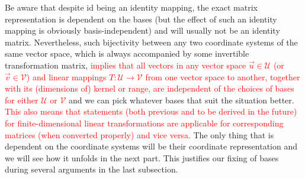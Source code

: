 Be aware that despite $\text{id}$ being an identity mapping, the exact matrix representation is dependent on the bases (but the effect of such an identity mapping is obviously basis-independent) and will usually not be an identity matrix. Nevertheless, such bijectivity between any two coordinate systems of the same vector space, which is always accompanied by some invertible transformation matrix, \textcolor{red}{implies that all vectors in any vector space $\vec{u} \in \mathcal{U}$ (or $\vec{v} \in \mathcal{V}$) and linear mappings $T: \mathcal{U} \to \mathcal{V}$ from one vector space to another, together with its (dimensions of) kernel or range, are independent of the choices of bases for either $\mathcal{U}$ or $\mathcal{V}$} and we can pick whatever bases that suit the situation better. \textcolor{red}{This also means that statements (both previous and to be derived in the future) for finite-dimensional linear transformations are applicable for corresponding matrices (when converted properly) and vice versa.} The only thing that is dependent on the coordinate systems will be their coordinate representation and we will see how it unfolds in the next part. This justifies our fixing of bases during several arguments in the last subsection.


